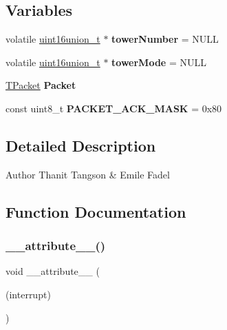 \subsection*{Variables}
\begin{DoxyCompactItemize}
\item 
\mbox{\label{group__main__module_gaabe3fea704d81e018d53b1ffec3d7f15}} 
volatile \hyperlink{unionuint16union__t}{uint16union\+\_\+t} $\ast$ {\bfseries tower\+Number} = N\+U\+LL
\item 
\mbox{\label{group__main__module_gad9be0a0a6e1cb0bf51763cde9ed47a17}} 
volatile \hyperlink{unionuint16union__t}{uint16union\+\_\+t} $\ast$ {\bfseries tower\+Mode} = N\+U\+LL
\item 
\mbox{\label{group__main__module_gac74c1cf77ae5807a61baefd6df20201e}} 
\hyperlink{union_t_packet}{T\+Packet} {\bfseries Packet}
\item 
\mbox{\label{group__main__module_ga5faca24c448374dc4656ebc31afcae0b}} 
const uint8\+\_\+t {\bfseries P\+A\+C\+K\+E\+T\+\_\+\+A\+C\+K\+\_\+\+M\+A\+SK} = 0x80
\end{DoxyCompactItemize}


\subsection{Detailed Description}
\begin{DoxyAuthor}{Author}
Thanit Tangson \& Emile Fadel 
\end{DoxyAuthor}


\subsection{Function Documentation}
\mbox{\label{group__main__module_ga445500277ba0e363873b34cffc015745}} 
\subsubsection{\texorpdfstring{\+\_\+\+\_\+attribute\+\_\+\+\_\+()}{\_\_attribute\_\_()}}
{\footnotesize\ttfamily void \+\_\+\+\_\+attribute\+\_\+\+\_\+ (\begin{DoxyParamCaption}\item[{(interrupt)}]{ }\end{DoxyParamCaption})}



